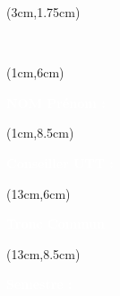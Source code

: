 \begin{titlepage}
    \thispagestyle{empty}

    

    \begin{textblock*}{15cm}(3cm,1.75cm)
        \begin{LARGE}
            \makeatletter
            \justifying

            \begin{center}
                \textbf{\textcolor{white}{\jobposition}}
                \\
                \textbf{\textcolor{white}{\thetitle}}
            \end{center}

            \makeatother
        \end{LARGE}
    \end{textblock*}

    \begin{textblock*}{10cm}(1cm,6cm)
        \begin{flushleft}
            \large
            \textbf{\textcolor{white}{NOM Prénom :}}
            \\
            \textbf{\textcolor{white}{\theauthor}}
        \end{flushleft}
    \end{textblock*}

    \begin{textblock*}{9cm}(1cm,8.5cm)
        \begin{flushleft}
            \large
            \textbf{\textcolor{white}{Conseiller UTT :}}
            \\
            \textbf{\textcolor{white}{\theRPeda}}
        \end{flushleft}
    \end{textblock*}


    \begin{textblock*}{7cm}(13cm,6cm)
        \begin{flushleft}
            \large
            \textbf{\textcolor{white}{Tronc Commun}}
        \end{flushleft}
    \end{textblock*}

    \begin{textblock*}{7cm}(13cm,8.5cm)
        \begin{flushleft}
            \large
            \textbf{\textcolor{white}{Semestre :}}
            \\
            \textcolor{white}{\theSemestre}
        \end{flushleft}
    \end{textblock*}



\end{titlepage}
